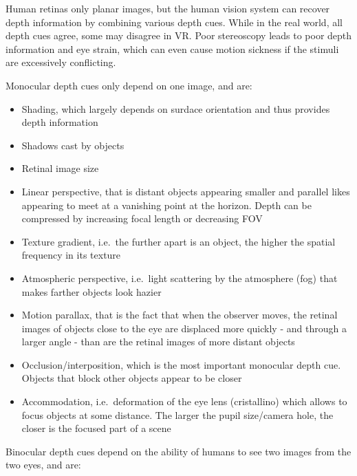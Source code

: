 \documentclass[a4paper]{article}
\begin{document}
Human retinas only planar images, but the human vision system can
recover depth information by combining various depth cues. While in the
real world, all depth cues agree, some may disagree in VR. Poor
stereoscopy leads to poor depth information and eye strain, which can
even cause motion sickness if the stimuli are excessively conflicting.

Monocular depth cues only depend on one image, and are:

\begin{itemize}

\item
  Shading, which largely depends on surdace orientation and thus
  provides depth information
\item
  Shadows cast by objects
\item
  Retinal image size
\item
  Linear perspective, that is distant objects appearing smaller and
  parallel likes appearing to meet at a vanishing point at the horizon.
  Depth can be compressed by increasing focal length or decreasing FOV
\item
  Texture gradient, i.e.~the further apart is an object, the higher the
  spatial frequency in its texture
\item
  Atmospheric perspective, i.e.~light scattering by the atmosphere (fog)
  that makes farther objects look hazier
\item
  Motion parallax, that is the fact that when the observer moves, the
  retinal images of objects close to the eye are displaced more quickly
  - and through a larger angle - than are the retinal images of more
  distant objects
\item
  Occlusion/interposition, which is the most important monocular depth
  cue. Objects that block other objects appear to be closer
\item
  Accommodation, i.e.~deformation of the eye lens (cristallino) which
  allows to focus objects at some distance. The larger the pupil
  size/camera hole, the closer is the focused part of a scene
\end{itemize}

Binocular depth cues depend on the ability of humans to see two images
from the two eyes, and are:
\end{document}
